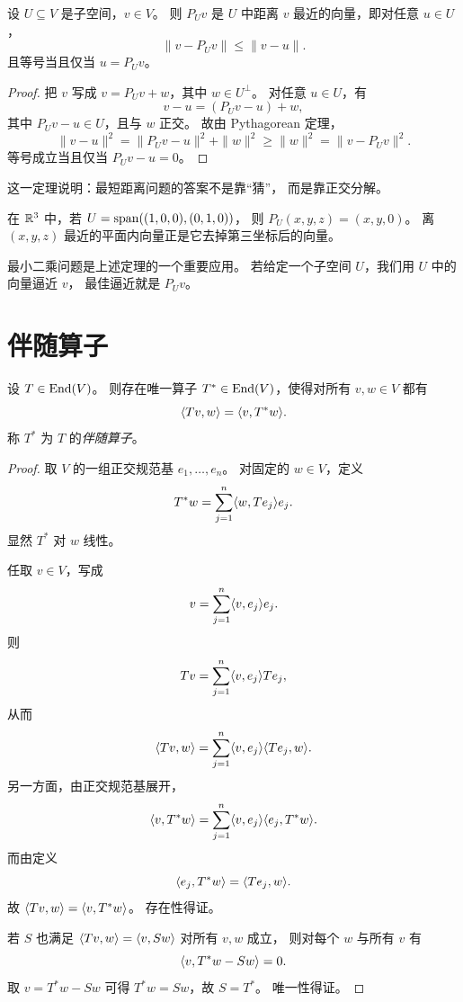 \begin{theorem}
设 $U\subseteq V$ 是子空间，$v\in V$。
则 $P_Uv$ 是 $U$ 中距离 $v$ 最近的向量，即对任意 $u\in U$，
\[
\|v-P_Uv\|\le \|v-u\|.
\]
且等号当且仅当 $u=P_Uv$。
\end{theorem}

\begin{proof}
把 $v$ 写成 $v=P_Uv+w$，其中 $w\in U^{\perp}$。
对任意 $u\in U$，有
\[
v-u=(P_Uv-u)+w,
\]
其中 $P_Uv-u\in U$，且与 $w$ 正交。
故由 Pythagorean 定理，
\[
\|v-u\|^2=\|P_Uv-u\|^2+\|w\|^2\ge \|w\|^2=\|v-P_Uv\|^2.
\]
等号成立当且仅当 $P_Uv-u=0$。
\end{proof}

\begin{remark}
这一定理说明：最短距离问题的答案不是靠“猜”，
而是靠正交分解。
\end{remark}

\begin{example}
在 $\mathbb{R}^3$ 中，若 $U=\operatorname{span}((1,0,0),(0,1,0))$，
则 $P_U(x,y,z)=(x,y,0)$。
离 $(x,y,z)$ 最近的平面内向量正是它去掉第三坐标后的向量。
\end{example}

最小二乘问题是上述定理的一个重要应用。
若给定一个子空间 $U$，我们用 $U$ 中的向量逼近 $v$，
最佳逼近就是 $P_Uv$。

\section{伴随算子}

\begin{theorem}
设 $T\in\mathrm{End}(V)$。
则存在唯一算子 $T^*\in\mathrm{End}(V)$，使得对所有 $v,w\in V$ 都有
\[
\langle Tv, w \rangle=\langle v, T^*w \rangle.
\]
称 $T^*$ 为 $T$ 的\emph{伴随算子}。
\end{theorem}

\begin{proof}
取 $V$ 的一组正交规范基 $e_1,\dots,e_n$。
对固定的 $w\in V$，定义
\[
T^*w=\sum_{j=1}^n \langle w, Te_j \rangle e_j.
\]
显然 $T^*$ 对 $w$ 线性。

任取 $v\in V$，写成
\[
v=\sum_{j=1}^n \langle v, e_j \rangle e_j.
\]
则
\[
Tv=\sum_{j=1}^n \langle v, e_j \rangle Te_j,
\]
从而
\[
\langle Tv, w \rangle=\sum_{j=1}^n \langle v, e_j \rangle\langle Te_j, w \rangle.
\]
另一方面，由正交规范基展开，
\[
\langle v, T^*w \rangle=\sum_{j=1}^n \langle v, e_j \rangle\langle e_j, T^*w \rangle.
\]
而由定义
\[
\langle e_j, T^*w \rangle=\langle Te_j, w \rangle.
\]
故 $\langle Tv, w \rangle=\langle v, T^*w \rangle$。
存在性得证。

若 $S$ 也满足 $\langle Tv, w \rangle=\langle v, Sw \rangle$ 对所有 $v,w$ 成立，
则对每个 $w$ 与所有 $v$ 有
\[
\langle v, T^*w-Sw \rangle=0.
\]
取 $v=T^*w-Sw$ 可得 $T^*w=Sw$，故 $S=T^*$。
唯一性得证。
\end{proof}

